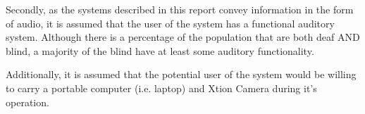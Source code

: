 Secondly, as the systems described in this report convey information in the form of audio, it is assumed that the user of the system has a functional auditory system. Although there is a percentage of the population that are both deaf AND blind, a majority of the blind have at least some auditory functionality.

Additionally, it is assumed that the potential user of the system would be willing to carry a portable computer (i.e. laptop) and Xtion Camera during it's operation.
